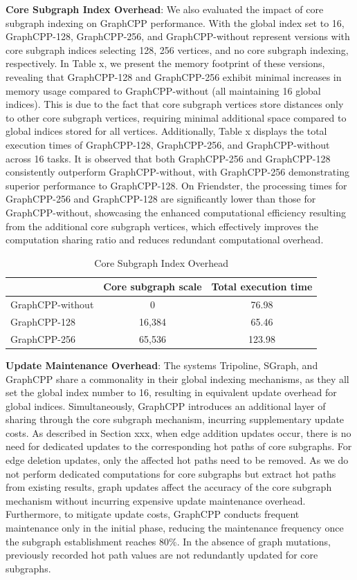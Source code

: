 \documentclass[lettersize,journal]{IEEEtran} %
\begin{document}
{\bf{Core Subgraph Index Overhead}}: We also evaluated the impact of core subgraph indexing on GraphCPP performance. With the global index set to 16, GraphCPP-128, GraphCPP-256, and GraphCPP-without represent versions with core subgraph indices selecting 128, 256 vertices, and no core subgraph indexing, respectively. In Table x, we present the memory footprint of these versions, revealing that GraphCPP-128 and GraphCPP-256 exhibit minimal increases in memory usage compared to GraphCPP-without (all maintaining 16 global indices). This is due to the fact that core subgraph vertices store distances only to other core subgraph vertices, requiring minimal additional space compared to global indices stored for all vertices. Additionally, Table x displays the total execution times of GraphCPP-128, GraphCPP-256, and GraphCPP-without across 16 tasks. It is observed that both GraphCPP-256 and GraphCPP-128 consistently outperform GraphCPP-without, with GraphCPP-256 demonstrating superior performance to GraphCPP-128. On Friendster, the processing times for GraphCPP-256 and GraphCPP-128 are significantly lower than those for GraphCPP-without, showcasing the enhanced computational efficiency resulting from the additional core subgraph vertices, which effectively improves the computation sharing ratio and reduces redundant computational overhead.

\begin{table}[htbp]
    \centering
    \label{tab:mytable}
    \begin{tabular}{|l|c|c|}
      \hline
      & Core subgraph scale  & Total execution time \\
      \hline
      GraphCPP-without & 0 & 76.98 \\
      GraphCPP-128 & 16,384 & 65.46 \\
      GraphCPP-256 & 65,536 & 123.98 \\
      \hline
    \end{tabular}
    \caption{Core Subgraph Index Overhead}
  \end{table}


{\bf{Update Maintenance Overhead}}: The systems Tripoline, SGraph, and GraphCPP share a commonality in their global indexing mechanisms, as they all set the global index number to 16, resulting in equivalent update overhead for global indices. Simultaneously, GraphCPP introduces an additional layer of sharing through the core subgraph mechanism, incurring supplementary update costs. As described in Section xxx, when edge addition updates occur, there is no need for dedicated updates to the corresponding hot paths of core subgraphs. For edge deletion updates, only the affected hot paths need to be removed. As we do not perform dedicated computations for core subgraphs but extract hot paths from existing results, graph updates affect the accuracy of the core subgraph mechanism without incurring expensive update maintenance overhead. Furthermore, to mitigate update costs, GraphCPP conducts frequent maintenance only in the initial phase, reducing the maintenance frequency once the subgraph establishment reaches 80\%. In the absence of graph mutations, previously recorded hot path values are not redundantly updated for core subgraphs.
\end{document}
